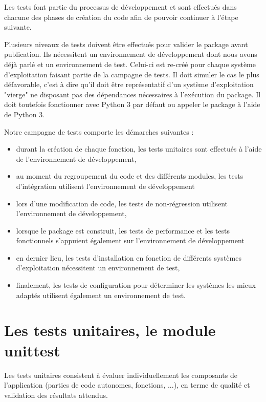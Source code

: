 \documentclass[twoside,a4paper,11pt,frenchb,openany]{report}
\begin{document}
Les tests font partie du processus de développement et sont effectués dans chacune des phases de création du code afin de pouvoir continuer à l'étape suivante.

Plusieurs niveaux de tests doivent être effectués pour valider le package avant publication. Ils nécessitent un environnement de développement dont nous avons déjà parlé et un environnement de test. Celui-ci est re-créé pour chaque système d'exploitation faisant partie de la campagne de tests. Il doit simuler le cas le plus défavorable, c'est à dire qu'il doit être représentatif d'un système d'exploitation "vierge" ne disposant pas des dépendances nécessaires à l'exécution du package. Il doit toutefois fonctionner avec Python 3 par défaut ou appeler le package à l'aide de Python 3. 

Notre campagne de tests comporte les démarches suivantes :
\begin{itemize}
\item durant la création de chaque fonction, les tests unitaires sont effectués à l'aide de l'environnement de développement,
\item au moment du regroupement du code et des différents modules, les tests d'intégration utilisent l'environnement de développement
\item lors d'une modification de code, les tests de non-régression utilisent l'environnement de développement,
\item lorsque le package est construit, les tests de performance et les tests fonctionnels s'appuient également sur l'environnement de développement
\item en dernier lieu, les tests d'installation en fonction de différents systèmes d'exploitation nécessitent un environnement de test,
\item finalement, les tests de configuration pour déterminer les systèmes les mieux adaptés utilisent également un environnement de test.
\end{itemize}







\section{Les tests unitaires, le module unittest}

Les tests unitaires consistent à évaluer individuellement les composants de l'application (parties de code autonomes, fonctions, ...), en terme de qualité et validation des résultats attendus.
\end{document}
